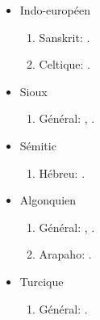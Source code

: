 \documentclass[oldfontcommands,oneside,a4paper,11pt]{article}
\newcommand{\langue}[2]{#2}
\begin{document}
\begin{itemize}
\begin{enumerate}
\end{enumerate}
\item \langue{Indo-European}{Indo-européen}
\begin{enumerate}
\item Sanskrit: \citet{jacques13vama}.
\item \langue{Celtic}{Celtique}: \citet{michaud-jacques12nasalite}.
\end{enumerate}
\item \langue{Siouan}{Sioux}
\begin{enumerate}
\item \langue{General}{Général}: \citet{jacques12bear},      \citet{michaud-jacques12nasalite}.  
\end{enumerate}
\item \langue{Semitic}{Sémitic}
\begin{enumerate}
\item \langue{Hebrew}{Hébreu}: \citet{rg-gj12yod}.
\end{enumerate}
\item \langue{Algonquian}{Algonquien}
\begin{enumerate}
\item \langue{General}{Général}: \citet{jacques12bear}, \citet{jacques14inverse}.
\item Arapaho: \citet{jacques13arapaho}.
\end{enumerate}
\item  \langue{Turkic}{Turcique}
\begin{enumerate}
\item  \langue{General}{Général}: \citet{antonov12kumush}.
\end{enumerate}
\end{itemize} 
 
\end{document}
